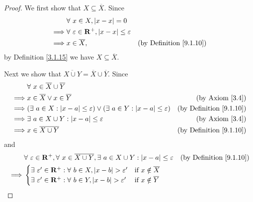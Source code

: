 \begin{proof}
    We first show that \(X \subseteq \overline{X}\).
    Since
    \begin{align*}
                 & \forall\ x \in X, \abs*{x - x} = 0                                                                         \\
        \implies & \forall\ \varepsilon \in \mathbf{R}^+, \abs*{x - x} \leq \varepsilon                                       \\
        \implies & x \in \overline{X},                                                  & \text{(by Definition \ref{9.1.10})}
    \end{align*}
    by Definition \ref{3.1.15} we have \(X \subseteq \overline{X}\).

    Next we show that \(\overline{X \cup Y} = \overline{X} \cup \overline{Y}\).
    Since
    \begin{align*}
                 & \forall\ x \in \overline{X} \cup \overline{Y}                                                                                                    \\
        \implies & x \in \overline{X} \lor x \in \overline{Y}                                                                 & \text{(by Axiom \ref{3.4})}         \\
        \implies & (\exists\ a \in X : \abs*{x - a} \leq \varepsilon) \lor (\exists\ a \in Y : \abs*{x - a} \leq \varepsilon) & \text{(by Definition \ref{9.1.10})} \\
        \implies & \exists\ a \in X \cup Y : \abs*{x - a} \leq \varepsilon                                                    & \text{(by Axiom \ref{3.4})}         \\
        \implies & x \in \overline{X \cup Y}                                                                                  & \text{(by Definition \ref{9.1.10})}
    \end{align*}
    and
    \begin{align*}
                 & \forall\ \varepsilon \in \mathbf{R}^+, \forall\ x \in \overline{X \cup Y}, \exists\ a \in X \cup Y : \abs*{x - a} \leq \varepsilon & \text{(by Definition \ref{9.1.10})} \\
        \implies & \begin{cases}
            \exists\ \varepsilon' \in \mathbf{R}^+ : \forall\ b \in X, \abs*{x - b} > \varepsilon' & \text{if } x \notin \overline{X} \\
            \exists\ \varepsilon' \in \mathbf{R}^+ : \forall\ b \in Y, \abs*{x - b} > \varepsilon' & \text{if } x \notin \overline{Y}

\end{cases}
\end{align*}
\end{proof}
